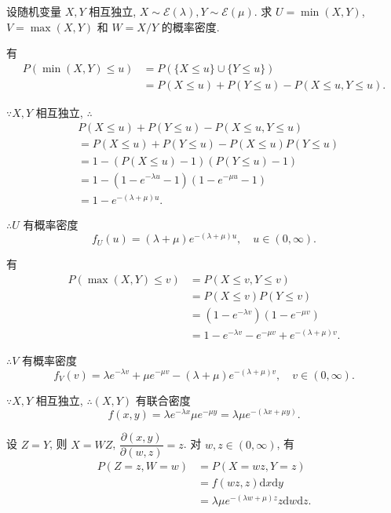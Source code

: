 \documentclass[color=black,device=normal,lang=cn]{elegantnote}
\numberwithin{equation}{section}
\theoremstyle{plain}
\numberwithin{exercise}{exsection}
\begin{document}
\begin{exercise}%
    设随机变量 $X,Y$ 相互独立, $X\sim\mathcal{E}(\lambda),Y\sim\mathcal{E}(\mu)$. 求 $U=\min(X,Y)$, $V=\max(X,Y)$ 和 $W=X/Y$ 的概率密度.
\end{exercise}
\begin{solution}
    有
    \begin{align*}
        P(\min(X,Y)\leq u) & =P(\{X\leq u\}\cup\{Y\leq u\}) \\
        & =P(X\leq u)+P(Y\leq u)-P(X\leq u,Y\leq u).
    \end{align*}

    $\because X,Y$ 相互独立, $\therefore$
    \begin{align*}
        & P(X\leq u)+P(Y\leq u)-P(X\leq u,Y\leq u) \\
        & =P(X\leq u)+P(Y\leq u)-P(X\leq u)P(Y\leq u) \\
        & =1-(P(X\leq u)-1)(P(Y\leq u)-1) \\
        & =1-(1-e^{-\lambda u}-1)(1-e^{-\mu u}-1) \\
        & =1-e^{-(\lambda+\mu)u}.
    \end{align*}

    $\therefore U$ 有概率密度
    \[f_U(u)=(\lambda+\mu)e^{-(\lambda+\mu)u},\quad u\in(0,\infty).\]

    有
    \begin{align*}
        P(\max(X,Y)\leq v) & =P(X\leq v,Y\leq v) \\
        & =P(X\leq v)P(Y\leq v) \\
        & =(1-e^{-\lambda v})(1-e^{-\mu v}) \\
        & =1-e^{-\lambda v}-e^{-\mu v}+e^{-(\lambda+\mu)v}.
    \end{align*}

    $\therefore V$ 有概率密度
    \[f_V(v)=\lambda e^{-\lambda v}+\mu e^{-\mu v}-(\lambda+\mu)e^{-(\lambda+\mu)v},\quad v\in(0,\infty).\]

    $\because X,Y$ 相互独立, $\therefore(X,Y)$ 有联合密度
    \[f(x,y)=\lambda e^{-\lambda x}\mu e^{-\mu y}=\lambda\mu e^{-(\lambda x+\mu y)}.\]

    设 $Z=Y$, 则 $X=WZ$, $\dfrac{\partial(x,y)}{\partial(w,z)}=z$. 对 $w,z\in(0,\infty)$, 有
    \begin{align*}
        P(Z=z,W=w) & =P(X=wz,Y=z) \\
        & =f(wz,z)\mathrm{d}x\mathrm{d}y \\
        & =\lambda\mu e^{-(\lambda w+\mu)z}z\mathrm{d}w\mathrm{d}z.
    \end{align*}


\end{solution}
\end{document}
